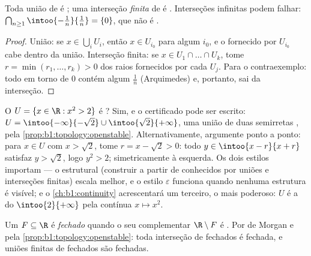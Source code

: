 \begin{proposition}\label{prop:b1:topology:openstable}
Toda união de  é ; uma interseção \emph{finita} de
 é . Interseções infinitas podem falhar:
$\bigcap_{n \geq 1} \intoo{-\frac 1n}{\frac 1n} = \{0\}$, que não é .
\end{proposition}

\begin{proof}
União: se $x \in \bigcup_i U_i$, então $x \in U_{i_0}$ para algum $i_0$,
e o  fornecido por $U_{i_0}$ cabe dentro da união. Interseção
finita: se $x \in U_1 \cap \dots \cap U_k$, tome $r = \min(r_1,
\dots, r_k) > 0$ dos raios fornecidos por cada $U_j$. Para o
contraexemplo: todo  em torno de $0$ contém algum $\frac{1}{n}$
(Arquimedes) e, portanto, sai da interseção.
\end{proof}

\begin{example}\label{ex:b1:topology:radii}
O  $U = \{x \in \R : x^2 > 2\}$ é ? Sim, e o certificado
pode ser escrito: $U = \intoo{-\infty}{-\sqrt2} \cup
\intoo{\sqrt2}{+\infty}$, uma união de duas semirretas , 
pela \cref{prop:b1:topology:openstable}. Alternativamente, argumente
ponto a ponto: para $x \in U$ com $x > \sqrt 2$, tome $r = x -
\sqrt2 > 0$: todo $y \in \intoo{x - r}{x + r}$ satisfaz $y >
\sqrt 2$, logo $y^2 > 2$; simetricamente à esquerda. Os dois
estilos importam --- o estrutural (construir a partir de 
conhecidos por uniões e interseções finitas) escala melhor, e o
estilo $\varepsilon$ funciona quando nenhuma estrutura é visível; e o
\cref{ch:b1:continuity} acrescentará um terceiro, o mais poderoso:
$U$ é a  do  $\intoo{2}{+\infty}$ pela
 contínua $x \mapsto x^2$.
\end{example}

\begin{definition}\label{def:b1:topology:closed}
Um  $F \subseteq \R$ é \emph{fechado} quando o
seu complementar $\R \setminus F$ é . Por de Morgan e pela
\cref{prop:b1:topology:openstable}: toda interseção de fechados é
fechada, e uniões finitas de fechados são fechadas.
\end{definition}

